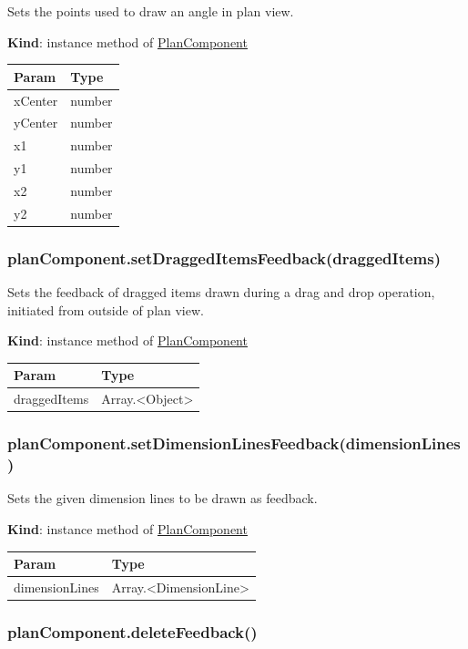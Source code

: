 \documentclass[a4paper]{report}
\begin{document}
Sets the points used to draw an angle in plan view.

\textbf{Kind}: instance method of
\protect\hyperlink{PlanComponent}{PlanComponent}

\begin{longtable}[]{@{}ll@{}}
\toprule
Param & Type\tabularnewline
\midrule
\endhead
xCenter & number\tabularnewline
yCenter & number\tabularnewline
x1 & number\tabularnewline
y1 & number\tabularnewline
x2 & number\tabularnewline
y2 & number\tabularnewline
\bottomrule
\end{longtable}

\hypertarget{plancomponent.setdraggeditemsfeedbackdraggeditems}{%
\subsubsection{planComponent.setDraggedItemsFeedback(draggedItems)}\label{plancomponent.setdraggeditemsfeedbackdraggeditems}}

Sets the feedback of dragged items drawn during a drag and drop
operation, initiated from outside of plan view.

\textbf{Kind}: instance method of
\protect\hyperlink{PlanComponent}{PlanComponent}

\begin{longtable}[]{@{}ll@{}}
\toprule
Param & Type\tabularnewline
\midrule
\endhead
draggedItems & Array.\textless Object\textgreater{}\tabularnewline
\bottomrule
\end{longtable}

\hypertarget{plancomponent.setdimensionlinesfeedbackdimensionlines}{%
\subsubsection{planComponent.setDimensionLinesFeedback(dimensionLines)}\label{plancomponent.setdimensionlinesfeedbackdimensionlines}}

Sets the given dimension lines to be drawn as feedback.

\textbf{Kind}: instance method of
\protect\hyperlink{PlanComponent}{PlanComponent}

\begin{longtable}[]{@{}ll@{}}
\toprule
Param & Type\tabularnewline
\midrule
\endhead
dimensionLines &
Array.\textless DimensionLine\textgreater{}\tabularnewline
\bottomrule
\end{longtable}

\hypertarget{plancomponent.deletefeedback}{%
\subsubsection{planComponent.deleteFeedback()}\label{plancomponent.deletefeedback}}
\end{document}
